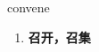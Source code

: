 
\begin{frame}
{\huge convene}
\begin{center}
\begin{enumerate}\Large
  \item \textbf{召开，召集}
\end{enumerate}
\end{center}
\end{frame}

